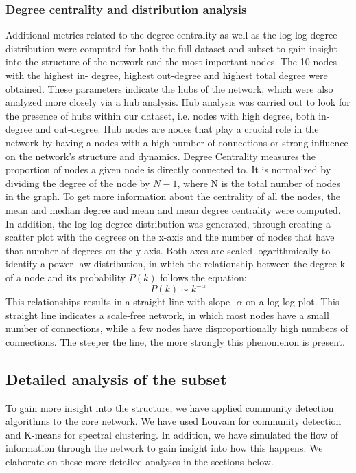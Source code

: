 \documentclass[conference]{IEEEtran}
\begin{document}
\subsubsection{Degree centrality and distribution analysis}
Additional metrics related to the degree centrality as well as the log log degree distribution were computed for both the full dataset and subset to gain insight into the structure of the network and the most important nodes. The 10 nodes with the highest in- degree, highest out-degree and highest total degree were obtained. These parameters indicate the hubs of the network, which were also analyzed more closely via a hub analysis. Hub analysis was carried out to look for the presence of hubs within our dataset, i.e. nodes with high degree, both in-degree and out-degree. Hub nodes are nodes that play a crucial role in the network by having a nodes with a high number of connections or strong influence on the network's structure and dynamics.
Degree Centrality measures the proportion of nodes a given node is directly connected to. It is normalized by dividing the degree of the node by \(N-1\), where N is the total number of nodes in the graph.
To get more information about the centrality of all the nodes, the mean and median degree and mean and mean degree centrality were computed. In addition, the log-log degree distribution was generated, through creating a scatter plot with the degrees on the x-axis and the number of nodes that have that number of degrees on the y-axis. Both axes are scaled logarithmically to identify a power-law distribution, in which the relationship between the degree k of a node and its probability \(P(k)\) follows the equation: \[P(k) \sim k^{-\alpha}\]
This relationships results in a straight line with slope -$\alpha$ on a log-log plot. This straight line indicates a scale-free network, in which most nodes have a small number of connections, while a few nodes have disproportionally high numbers of connections. The steeper the line, the more strongly this phenomenon is present. 

\subsection{Detailed analysis of the subset}
To gain more insight into the structure, we have applied community detection algorithms to the core network. We have used Louvain for community detection and K-means for spectral clustering. In addition, we have simulated the flow of information through the network to gain insight into how this happens. We elaborate on these more detailed analyses in the sections below.
\end{document}
